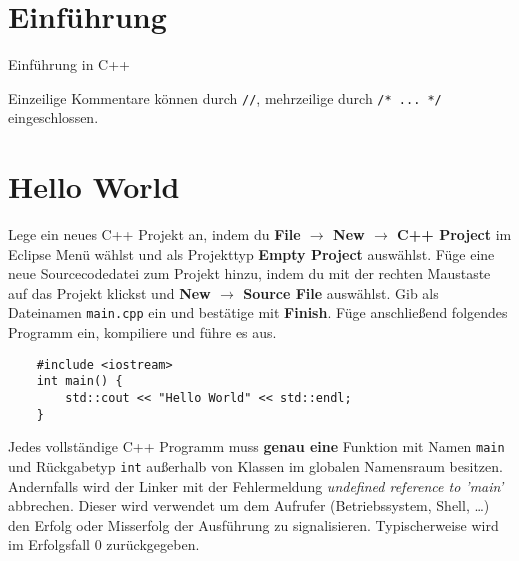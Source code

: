 

\newcommand{\exday}{1}

\cppSetTitle
\setcounter{section}{-1}



\cppSetHeaderAndMakeTitle

\section*{Einführung}
Einführung in C++

Einzeilige Kommentare können durch \texttt{//}, mehrzeilige durch \texttt{/* ... */} eingeschlossen.


\section{Hello World}
Lege ein neues C++ Projekt an, indem du \textbf{File $\rightarrow$ New $\rightarrow$ C++ Project} im Eclipse Menü wählst und als Projekttyp \textbf{Empty Project} auswählst.
Füge eine neue Sourcecodedatei zum Projekt hinzu, indem du mit der rechten Maustaste auf das Projekt klickst und \textbf{New $\rightarrow$ Source File} auswählst.
Gib als Dateinamen \texttt{main.cpp} ein und bestätige mit \textbf{Finish}.
Füge anschließend folgendes Programm ein, kompiliere und führe es aus.
\begin{lstlisting}
	#include <iostream>
	int main() {
		std::cout << "Hello World" << std::endl;
	}
\end{lstlisting}

Jedes vollständige C++ Programm muss \textbf{genau eine} Funktion mit Namen \texttt{main} und Rückgabetyp \texttt{int} außerhalb von Klassen im globalen Namensraum besitzen. Andernfalls wird der Linker mit der Fehlermeldung \emph{undefined reference to 'main'} abbrechen.
Dieser wird verwendet um dem Aufrufer (Betriebssystem, Shell, \dots) den Erfolg oder Misserfolg der Ausführung zu signalisieren.
Typischerweise wird im Erfolgsfall 0 zurückgegeben.

